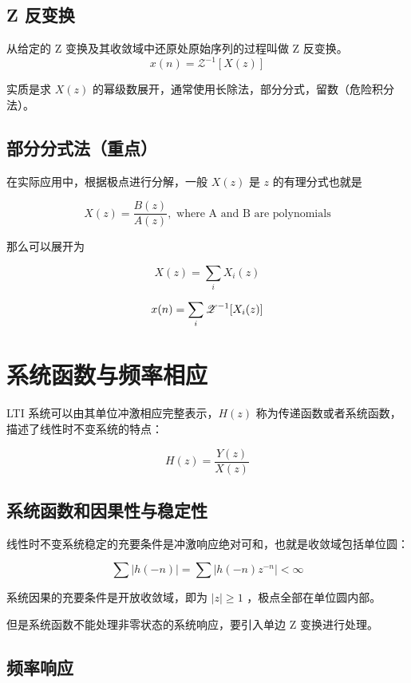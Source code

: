 \documentclass[cn,11pt,chinese,black,simple]{../elegantbook}
\begin{document}
\subsection{Z 反变换}

\begin{definition}[Z 反变换]
    从给定的 Z 变换及其收敛域中还原处原始序列的过程叫做 Z 反变换。
    \[x(n) = \mathscr{Z}^{-1}[X(z)]\]

    实质是求 \(X(z)\) 的幂级数展开，通常使用长除法，部分分式，留数（危险积分法）。
\end{definition}

\subsection*{部分分式法（重点）}

在实际应用中，根据极点进行分解，一般 \(X(z)\) 是 \(z\) 的有理分式也就是

\[X(z) = \frac{B(z)}{A(z)}, \text{ where A and B are polynomials}\]

那么可以展开为 

\[X(z) = \sum_i X_i(z)\]

\[x(n) = \sum_i \mathscr{Z}^{-1}[X_i (z)]\]

\section{系统函数与频率相应}

LTI 系统可以由其单位冲激相应完整表示，\(H(z)\) 称为传递函数或者系统函数，描述了线性时不变系统的特点：

\[H(z) = \frac{Y(z)}{X(z)}\] 

\subsection{系统函数和因果性与稳定性}

线性时不变系统稳定的充要条件是冲激响应绝对可和，也就是收敛域包括单位圆：

\[\sum |h(-n)| = \sum |h(-n) z^{-n}| < \infty \]

系统因果的充要条件是开放收敛域，即为 \(|z| \ge 1\) ，极点全部在单位圆内部。

但是系统函数不能处理非零状态的系统响应，要引入单边 Z 变换进行处理。

\subsection{频率响应}
\end{document}
